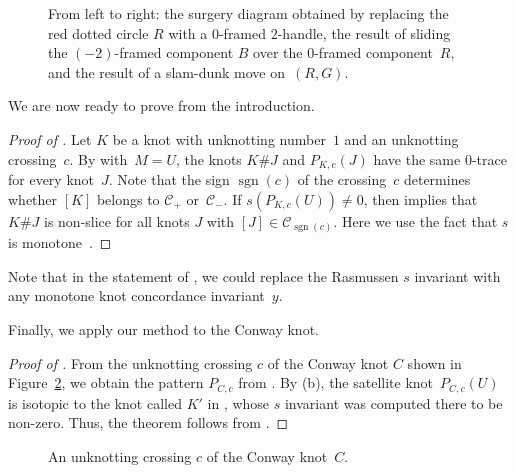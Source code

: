 \documentclass{amsart}
\newcommand{\CC}{\mathcal{C}}
\theoremstyle{remark}
\begin{document}
 \begin{figure}[t]
    \centering
    \def\svgwidth{1.\columnwidth}    
    \caption{From left to right: the surgery diagram obtained by replacing the red dotted circle $R$ with a $0$-framed $2$-handle, the result of sliding the $(-2)$-framed component $B$ over the $0$-framed component~$R$, and the result of a slam-dunk move on~$(R,G)$. 
    }
    \label{fig:isotopy}
\end{figure}

We are now ready to prove  from the introduction. 

\begin{proof}[{Proof of }]
    Let $K$ be a knot with unknotting number~$1$ and an unknotting crossing~$c$. By  with~$M=U$, the knots $K \# J$ and $P_{K,c}(J)$ have the same $0$-trace for every knot~$J$. Note that the sign $\operatorname{sgn}(c)$ of the crossing~$c$ determines whether $[K]$ belongs to $\CC_+$ or~$\CC_-$. If $s(P_{K,c}(U))\neq 0$, then  implies that~$K \# J$ is non-slice for all knots $J$ with $[J]\in \CC_{\operatorname{sgn}(c)}$. Here we use the fact that $s$ is monotone~\cite[Theorem~1.11]{manolescu-marengon-sarkar-willis}.
\end{proof}

Note that in the statement of , we could replace the Rasmussen $s$ invariant with any monotone knot concordance invariant~$y$.

Finally, we apply our method to the Conway knot.

\begin{proof}[{Proof of }]
    From the unknotting crossing $c$ of the Conway knot $C$ shown in Figure~\ref{fig:conway_crossing}, we obtain the pattern $P_{C,c}$ from . By (b), 
    the satellite knot~$P_{C,c}(U)$ is isotopic to the knot called  $K'$ in \cite{piccirillo:Conway}, whose $s$ invariant was computed there to be non-zero.
    Thus, the theorem follows from .
\end{proof}

\begin{figure}[ht]
     \def\svgwidth{0.3\columnwidth}
     
     \caption{An unknotting crossing $c$ of the Conway knot~$C$. 
     }
     \label{fig:conway_crossing}
\end{figure}
\end{document}
